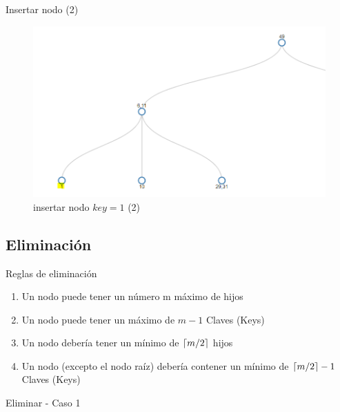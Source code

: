 \documentclass[11pt]{beamer}
\DeclarePairedDelimiter\ceil{\lceil}{\rceil}
\begin{document}
		
		\begin{frame}{Insertar nodo (2)}
			\justifying
			\begin{figure}[H]
				\centering
				\includegraphics[scale=0.35]{img/btree_ins_2.png}
				\caption{insertar nodo $key=1$ (2)}
				\label{fig:btree_ins_2}
			\end{figure}
		\end{frame}
		
		
		\subsection{Eliminación}
		\begin{frame}{Reglas de eliminación}
			\justifying
            \begin{enumerate}
                \item Un nodo puede tener un número m máximo de hijos
                \item Un nodo puede tener un máximo de $m-1$ Claves (Keys)
                \item Un nodo debería tener un mínimo de $\ceil*{m/2}$ hijos
                \item Un nodo (excepto el nodo raíz) debería contener un mínimo de $\ceil*{m/2}-1$ Claves (Keys)
            \end{enumerate}
			
		\end{frame}
		
		\begin{frame}{Eliminar - Caso 1}
			\justifying
			
			
			
		\end{frame}
		
\end{document}
